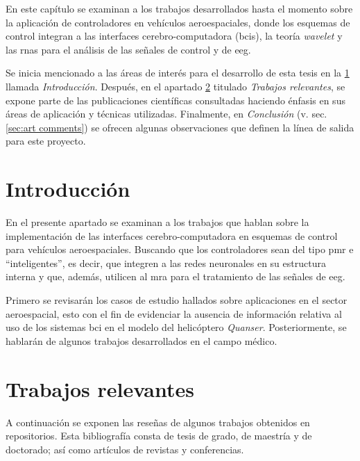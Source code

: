 \label{chap:state art}

En este capítulo se examinan a los trabajos desarrollados hasta el momento sobre la aplicación de controladores en vehículos aeroespaciales, donde los esquemas de control integran a las interfaces cerebro-computadora (\glspl{bci}), la teoría \textit{wavelet} y las \glspl{rna} para el análisis de las señales de control y de \acrfull{eeg}.

Se inicia mencionado a las áreas de interés para el desarrollo de esta tesis en la \cref{sec:art intro} llamada \textit{Introducción}. Después, en el apartado \ref{sec:art relevant research} titulado \textit{Trabajos relevantes}, se expone parte de las publicaciones científicas consultadas haciendo énfasis en sus áreas de aplicación y técnicas utilizadas. Finalmente, en \textit{Conclusión} (v. sec. \ref{sec:art comments}) se ofrecen algunas observaciones que definen la línea de salida para este proyecto.

\section{Introducción}\label{sec:art intro}
    
    En el presente apartado se examinan a los trabajos que hablan sobre la implementación de las interfaces cerebro-computadora en esquemas de control para vehículos aeroespaciales. Buscando que los controladores sean del tipo \acrfull{pmr} e ``inteligentes'', es decir, que integren a las redes neuronales en su estructura interna \cite[p. 285]{Matilde2011} y que, además, utilicen al \acrfull{mra} para el tratamiento de las señales de \acrlong{eeg}. 
    
    Primero se revisarán los casos de estudio hallados sobre aplicaciones en el sector aeroespacial, esto con el fin de evidenciar la ausencia de información relativa al uso de los sistemas \acrshort{bci} en el modelo del helicóptero \textit{Quanser}. Posteriormente, se hablarán de algunos trabajos desarrollados en el campo médico.
    
\section{Trabajos relevantes}\label{sec:art relevant research}

    A continuación se exponen las reseñas de algunos trabajos obtenidos en repositorios. Esta bibliografía consta de tesis de grado, de maestría y de doctorado; así como artículos de revistas y conferencias.
    
